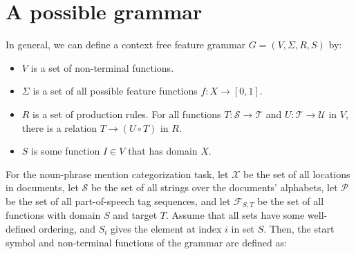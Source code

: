 \documentclass[11pt,letterpaper]{article}
\begin{document}



\section{A possible grammar}
\label{sec:grammars}

In general, we can define a context free feature grammar $G=(V,\Sigma,R,S)$
by:

\begin{itemize}
\item $V$ is a set of non-terminal functions.  

\item $\Sigma$ is a set of all possible feature functions $f:X\rightarrow [0,1]$.

\item $R$ is a set of production rules.  For all functions 
$T:\mathcal{S}\rightarrow \mathcal{T}$ and $U:\mathcal{T}\rightarrow \mathcal{U}$ 
in $V$, there is a relation $T\rightarrow (U\circ T)$ in $R$.

\item $S$ is some function $I\in V$ that has domain $X$.
\end{itemize}

For the noun-phrase mention categorization task, let $\mathcal{X}$ be
the set of all locations in documents, let $\mathcal{S}$ be the set of all
strings over the documents' alphabets, let $\mathcal{P}$ be the set of all
part-of-speech tag sequences, and let $\mathcal{F}_{S,T}$ be the set of all functions with
domain $S$ and target $T$. 
Assume that all sets have some well-defined ordering,
and $S_i$ gives the element at index $i$ in set $S$.  Then, the start symbol
and non-terminal functions of the grammar are defined as:
\end{document}
